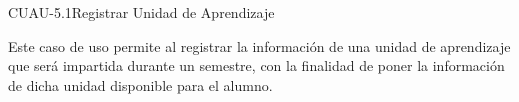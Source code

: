 \begin{UseCase}{CUAU-5.1}{Registrar Unidad de Aprendizaje}
	{
		Este caso de uso permite al  registrar la información de una unidad de aprendizaje que será impartida durante un semestre, con la finalidad de poner la información de dicha unidad disponible para el alumno.
			
		}
		
		
		

\end{UseCase}
